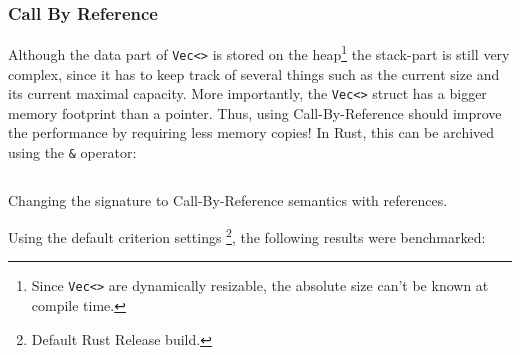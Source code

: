 \subsubsection{Call By Reference}
Although the data part of \texttt{Vec<>} is stored on the heap\footnote{Since \texttt{Vec<>} are dynamically resizable, the absolute size can't be known at compile time.} the stack-part is still very complex, since it has to keep track of several things such as the current size and its current maximal capacity. More importantly, the \texttt{Vec<>} struct has a bigger memory footprint than a pointer. Thus, using Call-By-Reference should improve the performance by requiring less memory copies! In Rust, this can be archived using the \texttt{\&} operator:

\begin{listing}[H]
  \inputminted{rust}{./assets/call_by_ref.rs}
\caption{Changing the signature to Call-By-Reference semantics with references.}
\end{listing}

Using the default criterion settings \footnote{Default Rust Release build.}, the following results were benchmarked:


